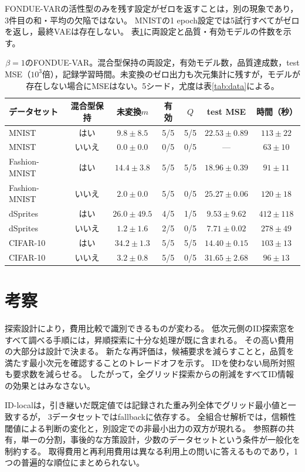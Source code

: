 \documentclass[11pt,a4paper]{ltjsarticle}
\begin{document}
FONDUE-VARの活性型のみを残す設定がゼロを返すことは，別の現象であり，3件目の和・平均の欠陥ではない。
MNISTの1 epoch設定では5試行すべてがゼロを返し，最終VAEは存在しない。
表\ref{tab:var}に両設定と品質・有効モデルの件数を示す。

\begin{table}[H]
\caption{$\beta=1$のFONDUE-VAR。混合型保持の両設定，有効モデル数，品質達成数，test MSE（$10^3$倍），記録学習時間。未変換のゼロ出力も次元集計に残すが，モデルが存在しない場合にMSEはない。5シード，尤度は表\ref{tab:data}による。}\label{tab:var}
\footnotesize
\setlength{\tabcolsep}{3.5pt}
\begin{tabular*}{\textwidth}{@{\extracolsep{\fill}}lcccccc@{}}
\toprule
データセット & 混合型保持 & 未変換$m$ & 有効 & $Q$ & test MSE & 時間（秒） \\
\midrule
MNIST & はい & $9.8 \pm 8.5$ & 5/5 & 5/5 & $22.53 \pm 0.89$ & $113 \pm 22$ \\
MNIST & いいえ & $0.0 \pm 0.0$ & 0/5 & 0/5 & --- & $63 \pm 10$ \\
Fashion-MNIST & はい & $14.4 \pm 3.8$ & 5/5 & 5/5 & $18.96 \pm 0.39$ & $91 \pm 11$ \\
Fashion-MNIST & いいえ & $2.0 \pm 0.0$ & 5/5 & 0/5 & $25.27 \pm 0.06$ & $120 \pm 18$ \\
dSprites & はい & $26.0 \pm 49.5$ & 4/5 & 1/5 & $9.53 \pm 9.62$ & $412 \pm 118$ \\
dSprites & いいえ & $1.2 \pm 1.6$ & 2/5 & 0/5 & $7.71 \pm 0.02$ & $278 \pm 49$ \\
CIFAR-10 & はい & $34.2 \pm 1.3$ & 5/5 & 5/5 & $14.40 \pm 0.15$ & $103 \pm 13$ \\
CIFAR-10 & いいえ & $3.2 \pm 0.8$ & 5/5 & 0/5 & $31.65 \pm 2.68$ & $96 \pm 13$ \\
\bottomrule
\end{tabular*}
\end{table}

\section{考察}\label{sec:discussion}
探索設計により，費用比較で識別できるものが変わる。
低次元側のID探索窓をすべて調べる手順には，昇順探索に十分な処理が既に含まれる。
その高い費用の大部分は設計で決まる。
新たな再評価は，候補要求を減らすことと，品質を満たす最小次元を確認することのトレードオフを示す。
IDを使わない局所対照も要求数を減らせる。
したがって，全グリッド探索からの削減をすべてID情報の効果とはみなさない。

ID-localは，引き継いだ既定値では記録された重み列全体でグリッド最小値と一致するが，
3データセットではfallbackに依存する。
全組合せ解析では，信頼性閾値による判断の変化と，別設定での非最小出力の双方が現れる。
参照群の共有，単一の分割，事後的な方策設計，少数のデータセットという条件が一般化を制約する。
取得費用と再利用費用は異なる利用上の問いに答えるものであり，1つの普遍的な順位にまとめられない。
\end{document}
